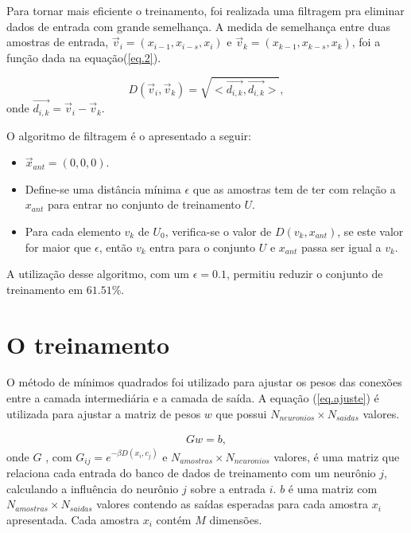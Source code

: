 \documentclass[10pt,journal,letterpaper,compsoc]{IEEEtran}
\begin{document}
Para tornar mais eficiente o treinamento, foi realizada uma filtragem pra eliminar dados de entrada com
grande semelhança. A medida de semelhança entre duas amostras de entrada, 
$\vec{v}_i = (x_{i-1}, x_{i-s}, x_{i})$ e 
$\vec{v}_k = (x_{k-1}, x_{k-s}, x_{k})$, foi a função dada na equação(\ref{eq.2}).

\begin{equation} 
D(\vec{v}_i,\vec{v}_k) = \sqrt{  <\vec{d_{i,k}}, \vec{d_{i,k}}>},
\label{eq.2}
\end{equation}
onde $\vec{d_{i,k}} = \vec{v}_i - \vec{v}_k$.

O algoritmo de filtragem é o apresentado a seguir:

\begin{itemize}
\item $\vec{x}_{ant} = (0, 0, 0)$.
\item Define-se uma distância mínima $\epsilon$ que as amostras tem de ter com relação a $x_{ant}$
para entrar no conjunto de treinamento $U$.
\item Para cada elemento $v_k$ de $U_0$, verifica-se o valor de $D(v_k, x_{ant})$, se este
valor for maior que $\epsilon$, então $v_k$ entra para o conjunto $U$ e $x_{ant}$ passa ser
igual a $v_k$.
\end{itemize}

A utilização desse algoritmo, com um $\epsilon = 0.1$, permitiu reduzir o conjunto de treinamento
em $61.51 \%$.

\section{O treinamento}

O método de mínimos quadrados foi utilizado para ajustar os pesos das conexões entre a camada intermediária
e a camada de saída. A equação (\ref{eq.ajuste}) é utilizada para ajustar a matriz de pesos $w$ que possui
$N_{neuronios} \times N_{saidas}$ valores.

\begin{eqnarray}
Gw = b, 
\label{eq.ajuste}
\end{eqnarray}
onde $G$ , com $G_{ij} = e^{-\beta D(x_i, c_j)}$ e $N_{amostras} \times N_{neuronios}$ valores, é uma 
matriz que relaciona cada entrada do banco de dados de treinamento
com um neurônio $j$,  calculando a influência do neurônio $j$ sobre a entrada $i$. $b$ é uma matriz
 com $N_{amostras} \times N_{saidas}$ valores contendo as saídas esperadas para cada amostra $x_i$
 apresentada. Cada amostra $x_i$ contém $M$ dimensões.
 
\end{document}
